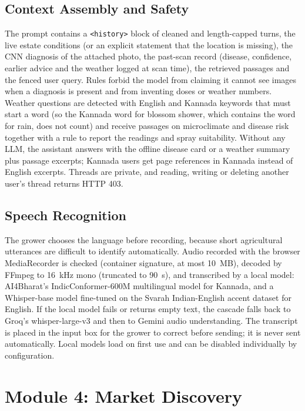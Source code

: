 \subsection{Context Assembly and Safety}
The prompt contains a \texttt{<history>} block of cleaned and length-capped turns, the live estate conditions (or an
explicit statement that the location is missing), the CNN diagnosis of the attached photo, the past-scan record
(disease, confidence, earlier advice and the weather logged at scan time), the retrieved passages and the fenced user
query. Rules forbid the model from claiming it cannot see images when a diagnosis is present and from inventing doses or
weather numbers. Weather questions are detected with English and Kannada keywords that must start a word (so the
Kannada word for blossom shower, which contains the word for rain, does not count) and receive passages on
microclimate and disease risk together with a rule to report the readings and spray suitability. Without any LLM, the
assistant answers with the offline disease card or a weather summary plus passage excerpts; Kannada users get page
references in Kannada instead of English excerpts. Threads are private, and
reading, writing or deleting another user's thread returns HTTP 403.

\subsection{Speech Recognition}
The grower chooses the language before recording, because short agricultural utterances are difficult to identify
automatically. Audio recorded with the browser MediaRecorder is checked (container signature, at most 10~MB), decoded by
FFmpeg to 16~kHz mono (truncated to 90~s), and transcribed by a local model: AI4Bharat's IndicConformer-600M multilingual
model for Kannada, and a Whisper-base model fine-tuned on the Svarah Indian-English accent
dataset for English. If the local model fails or returns empty text, the cascade falls back to Groq's
whisper-large-v3 and then to Gemini audio understanding. The transcript is placed in the input box for the grower to
correct before sending; it is never sent automatically. Local models load on first use and can be disabled
individually by configuration.

\section{Module 4: Market Discovery}

